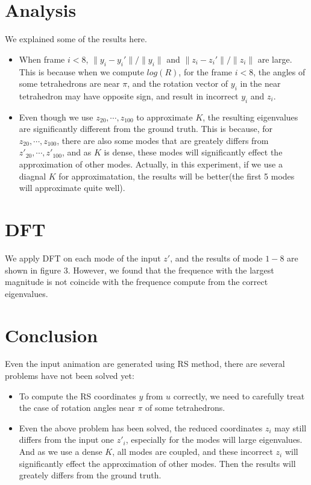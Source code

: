\documentclass[twocolumn,a4paper]{article}
\begin{document}
\section{Analysis}
We explained some of the results here. 
\begin{itemize}
\item When frame $i<8$, $\|y_i-y_i'\|/\|y_i\|$ and $\|z_i-z_i'\|/\|z_i\|$ are
  large. This is because when we compute $log(R)$, for the frame $i<8$, the
  angles of some tetrahedrons are near $\pi$, and the rotation vector of $y_i$
  in the near tetrahedron may have opposite sign, and result in incorrect $y_i$
  and $z_i$.
\item Even though we use $z_{20},\cdots,z_{100}$ to approximate $K$, the
  resulting eigenvalues are significantly different from the ground truth. This
  is because, for $z_{20},\cdots,z_{100}$, there are also some modes that are
  greately differs from $z'_{20},\cdots,z'_{100}$, and as $K$ is dense, these
  modes will significantly effect the approximation of other modes. Actually, in
  this experiment, if we use a diagnal $K$ for approximatation, the results will
  be better(the first 5 modes will approximate quite well).
\end{itemize}

\section{DFT}
We apply DFT on each mode of the input $z'$, and the results of mode $1-8$ are
shown in figure 3. However, we found that the frequence with the largest
magnitude is not coincide with the frequence compute from the correct
eigenvalues.

\section{Conclusion}
Even the input animation are generated using RS method, there are several
problems have not been solved yet:
\begin{itemize}
\item To compute the RS coordinates $y$ from $u$ correctly, we need to carefully
  treat the case of rotation angles near $\pi$ of some tetrahedrons.
\item Even the above problem has been solved, the reduced coordinates $z_i$ may
  still differs from the input one $z'_i$, especially for the modes will large
  eigenvalues. And as we use a dense $K$, all modes are coupled, and these
  incorrect $z_i$ will significantly effect the approximation of other
  modes. Then the results will greately differs from the ground truth.
\end{itemize}
\end{document}
